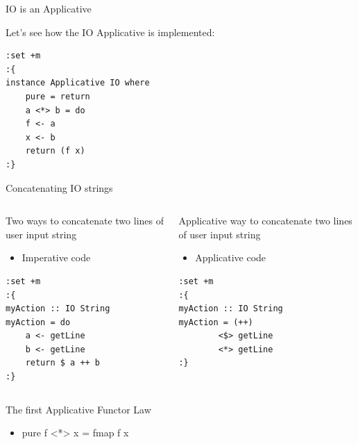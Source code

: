 \documentclass[presetation]{beamer}
\begin{document}
\begin{frame}[fragile,label={sec:org639de2e}]{IO is an Applicative}
 \begin{block}{Let's see how the IO Applicative is implemented:}
\begin{verbatim}
:set +m
:{
instance Applicative IO where
    pure = return
    a <*> b = do
	f <- a
	x <- b
	return (f x)
:}
\end{verbatim}
\end{block}
\end{frame}

\begin{frame}[fragile,label={sec:org2f066b5}]{Concatenating IO strings}
 \begin{columns}
\begin{column}{.48\columnwidth}
\begin{block}{Two ways to concatenate two lines of user input string}
\begin{itemize}
\item Imperative code
\end{itemize}
\begin{verbatim}
:set +m
:{
myAction :: IO String
myAction = do
    a <- getLine
    b <- getLine
    return $ a ++ b
:}
\end{verbatim}
\end{block}
\end{column}

\begin{column}{.48\columnwidth}
\begin{block}{Applicative way to concatenate two lines of user input string}
\begin{itemize}
\item Applicative code
\end{itemize}
\begin{verbatim}
:set +m
:{
myAction :: IO String
myAction = (++) 
	    <$> getLine 
	    <*> getLine
:}
\end{verbatim}
\end{block}
\end{column}
\end{columns}
\end{frame}

\begin{frame}[label={sec:org82348e4}]{The first Applicative Functor Law}
\begin{theorem}
\begin{itemize}
\item pure f <*> x = fmap f x
\end{itemize}
\end{theorem}
\end{frame}
\end{document}
